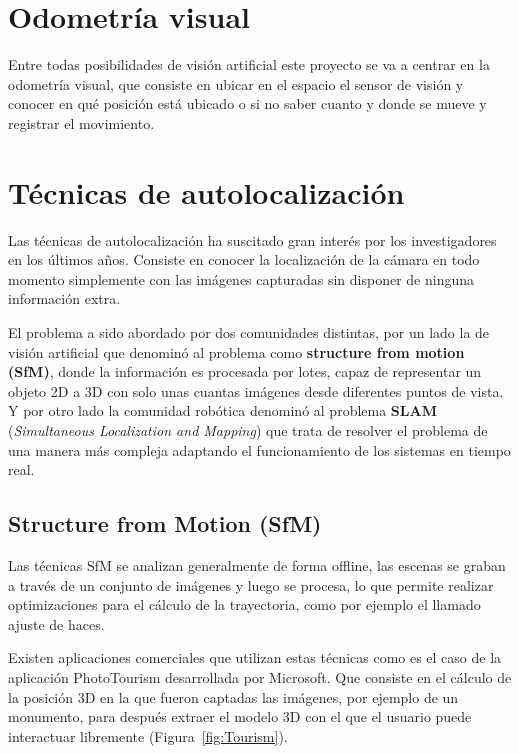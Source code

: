\section{Odometría visual}

Entre todas posibilidades de visión artificial este proyecto se va a centrar en la odometría visual, que consiste en ubicar en el espacio el sensor de visión y conocer en qué posición está ubicado o si no saber cuanto y donde se mueve y registrar el movimiento.




\section{Técnicas de autolocalización}

Las técnicas de autolocalización ha suscitado gran interés por los investigadores en los últimos años. Consiste en conocer la localización de la cámara en todo momento simplemente con las imágenes capturadas sin disponer de ninguna información extra.

El problema a sido abordado por dos comunidades distintas, por un lado la de visión artificial que denominó al problema como \textbf{structure from motion (SfM)}, donde la información es procesada por lotes, capaz de representar un objeto 2D a 3D con solo unas cuantas imágenes desde diferentes puntos de vista. Y por otro lado la comunidad robótica denominó al problema \textbf{SLAM} (\textit{Simultaneous Localization and Mapping}) que trata de resolver el problema de una manera más compleja adaptando el funcionamiento de los sistemas en tiempo real.

\subsection{Structure from Motion (SfM)}

Las técnicas SfM se analizan generalmente de forma offline, las escenas se graban a través de un conjunto de imágenes y luego se procesa, lo que permite realizar optimizaciones para el cálculo de la trayectoria, como por ejemplo el llamado ajuste de haces.

Existen aplicaciones comerciales que utilizan estas técnicas como es el caso de la aplicación PhotoTourism \parencite{Reference2} desarrollada por Microsoft. Que consiste en el cálculo de la posición 3D en la que fueron captadas las imágenes, por ejemplo de un monumento, para después extraer el modelo 3D con el que el usuario puede interactuar libremente (Figura~\ref{fig:Tourism}).

